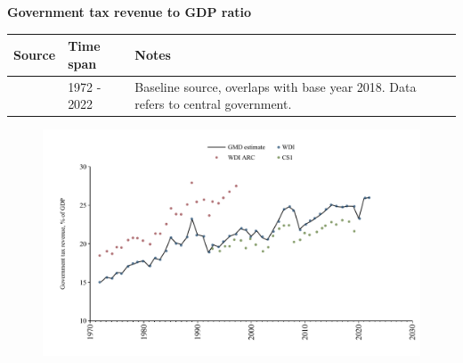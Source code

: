 \documentclass[12pt,a4paper,landscape]{article}
\begin{document}
\begin{adjustbox}{max totalsize={\paperwidth}{\paperheight},center}
\begin{minipage}[t][\textheight][t]{\textwidth}
\vspace*{0.5cm}
{}
\begin{center}
{\Large\bfseries Government tax revenue to GDP ratio}
\end{center}
\vspace{0.5cm}
\begin{table}[H]
\centering
\small
\begin{tabular}{|l|l|l|}
\hline
\textbf{Source} & \textbf{Time span} & \textbf{Notes} \\
\hline
\rowcolor{white}\cite{WDI}& 1972 - 2022 &Baseline source, overlaps with base year 2018. Data refers to central government.\\
\hline
\end{tabular}
\end{table}
\begin{figure}[H]
\centering
\includegraphics[width=\textwidth,height=0.6\textheight,keepaspectratio]{graphs/ZAF_govtax_GDP.pdf}
\end{figure}
\end{minipage}
\end{adjustbox}
\end{document}
